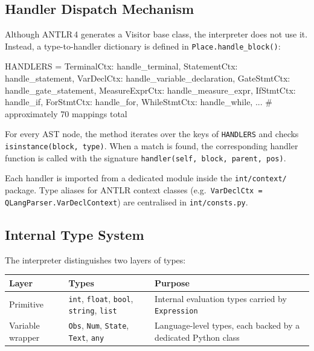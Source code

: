 \subsection{Handler Dispatch Mechanism}
\label{sec:impl-dispatch}

Although ANTLR\,4 generates a Visitor base class, the interpreter does
not use it.  Instead, a type-to-handler dictionary
is defined in \texttt{Place.handle\_block()}:

\begin{codebox}
HANDLERS = {
    TerminalCtx:          handle_terminal,
    StatementCtx:         handle_statement,
    VarDeclCtx:           handle_variable_declaration,
    GateStmtCtx:          handle_gate_statement,
    MeasureExprCtx:       handle_measure_expr,
    IfStmtCtx:            handle_if,
    ForStmtCtx:           handle_for,
    WhileStmtCtx:         handle_while,
    ...                   # approximately 70 mappings total
}
\end{codebox}

For every AST node, the method iterates over the keys of \texttt{HANDLERS}
and checks \texttt{isinstance(block, }\texttt{type)}.  When a match is found, the
corresponding handler function is called with the signature
\texttt{handler(self, block, parent, pos)}.

Each handler is imported from a dedicated module inside the
\texttt{int/context/} package.  Type aliases for ANTLR context classes
(e.g.\ \texttt{VarDeclCtx = QLangParser.VarDeclContext}) are centralised in
\texttt{int/consts.py}.

\subsection{Internal Type System}
\label{sec:impl-types}

The interpreter distinguishes two layers of types:

\begin{center}
\begin{tabular}{|l|l|p{7cm}|}
\hline
\textbf{Layer} & \textbf{Types} & \textbf{Purpose} \\
\hline
Primitive &
    \texttt{int}, \texttt{float}, \texttt{bool}, \texttt{string}, \texttt{list} &
    Internal evaluation types carried by \texttt{Expression} \\
\hline
Variable wrapper &
    \texttt{Obs}, \texttt{Num}, \texttt{State}, \texttt{Text}, \texttt{any} &
    Language-level types, each backed by a dedicated Python class \\
\hline
\end{tabular}
\end{center}


